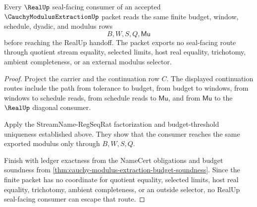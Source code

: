 \begin{theorem}
\label{thm:cauchy-modulus-extraction-realup-seal-nonescape}
Every $\RealUp$ seal-facing consumer of an accepted $\CauchyModulusExtractionUp$ packet reads the same finite budget, window, schedule, dyadic, and modulus rows
$$
B,W,S,Q,\mathsf{Mu}
$$
before reaching the RealUp handoff. The packet exports no seal-facing route through quotient stream equality, selected limits, host real equality, trichotomy, ambient completeness, or an external modulus selector.
\end{theorem}
\begin{proof}
Project the carrier and the continuation row $C$. The displayed continuation routes include the path from tolerance to budget, from budget to windows, from windows to schedule reads, from schedule reads to $\mathsf{Mu}$, and from $\mathsf{Mu}$ to the $\RealUp$ diagonal consumer.

Apply the StreamName-RegSeqRat factorization and budget-threshold uniqueness established above. They show that the consumer reaches the same exported modulus only through $B,W,S,Q$.

Finish with ledger exactness from the NameCert obligations and budget soundness from \autoref{thm:cauchy-modulus-extraction-budget-soundness}. Since the finite packet has no coordinate for quotient equality, selected limits, host real equality, trichotomy, ambient completeness, or an outside selector, no RealUp seal-facing consumer can escape that route.
\end{proof}

